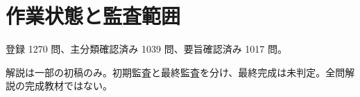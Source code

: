 \chapter{作業状態と監査範囲}
登録 1270 問、主分類確認済み 1039 問、要旨確認済み 1017 問。
\par 解説は一部の初稿のみ。初期監査と最終監査を分け、最終完成は未判定。全問解説の完成教材ではない。
